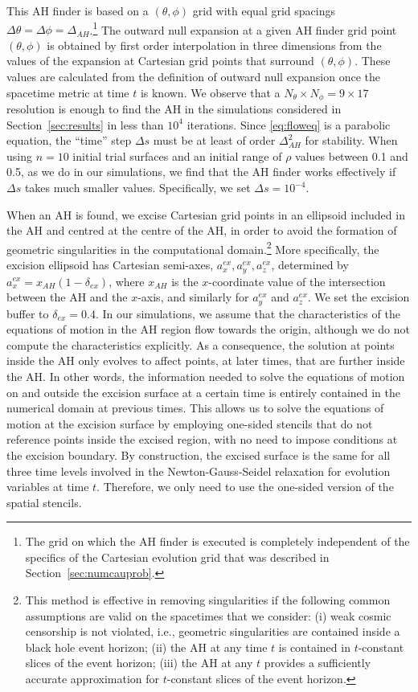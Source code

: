 \documentclass[a4paper,11pt]{article}
\numberwithin{equation}{section}
\begin{document}
This AH finder is based on a $(\theta,\phi)$ grid with equal grid spacings $\Delta \theta=\Delta\phi=\Delta_{AH}$.\footnote{The grid on which the AH finder is executed is completely independent of the specifics of the Cartesian evolution grid that was described in Section~\ref{sec:numcauprob}.} 
The outward null expansion at a given AH finder grid point $(\theta,\phi)$ is obtained by first order interpolation in three dimensions from the values of the expansion at Cartesian grid points that surround $(\theta,\phi)$.
These values are calculated from the definition of outward null expansion once the spacetime metric at time $t$ is known.
We observe that a $N_\theta\times N_\phi=9\times 17$ resolution is enough to find the AH in the simulations considered in Section~\ref{sec:results} in less than $10^{4}$ iterations. Since \eqref{eq:floweq} is a parabolic equation, the ``time'' step $\Delta s$ must be at least of order $\Delta_{AH}^2$ for stability. When using $n=10$ initial trial surfaces and an initial range of $\rho$ values between 0.1 and 0.5, as we do in our simulations, we find that the AH finder works effectively if $\Delta s$ takes much smaller values. Specifically, we set $\Delta s=10^{-4}$.

When an AH is found, we excise Cartesian grid points in an ellipsoid included in the AH and centred at the centre of the AH, in order to avoid the formation of geometric singularities in the computational domain.\footnote{This method is effective in removing singularities if the following common assumptions are valid on the spacetimes that we consider: (i) weak cosmic censorship is not violated, i.e., geometric singularities are contained inside a black hole event horizon; (ii) the AH at any time $t$ is contained in $t$-constant slices of the event horizon; (iii) the AH at any $t$ provides a sufficiently accurate approximation for $t$-constant slices of the event horizon.}
More specifically, the excision ellipsoid has Cartesian semi-axes, $a_x^{ex},a_y^{ex},a_z^{ex}$, determined by $a_x^{ex}=x_{AH}(1-\delta_{ex})$, where $x_{AH}$ is the $x$-coordinate value of the intersection between the AH and the $x$-axis, and similarly for $a_y^{ex}$ and $a_z^{ex}$. We set the excision buffer to $\delta_{ex}=0.4$. 
In our simulations, we assume that the characteristics of the equations of motion in the AH region flow towards the origin, although we do not compute the characteristics explicitly.  As a consequence, the solution at points inside the AH only evolves to affect points, at later times, that are further inside the AH. In other words, the information needed to solve the equations of motion on and outside the excision surface at a certain time is entirely contained in the numerical domain at previous times. This allows us to solve the equations of motion at the excision surface by employing one-sided stencils that do not reference points inside the excised region, with no need to impose conditions at the excision boundary. By construction, the excised surface is the same for all three time levels involved in the Newton-Gauss-Seidel relaxation for evolution variables at time $t$. Therefore, we only need to use the one-sided version of the spatial stencils. 
\end{document}
